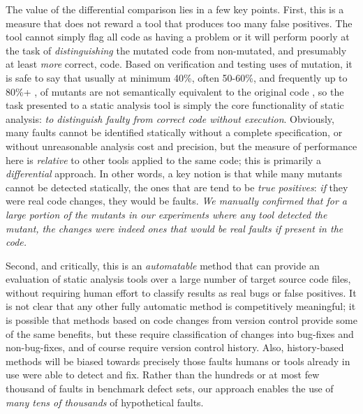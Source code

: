 The value of the differential comparison lies in a few key points.  First, this is a measure that does not reward a tool that produces too many false positives.  The tool cannot simply flag all code as having a problem or it will perform poorly at the task of \emph{distinguishing} the mutated code from non-mutated, and presumably at least \emph{more} correct, code.  Based on verification and testing uses of mutation, it is safe to say that usually at minimum 40\%, often 50-60\%, and frequently up to 80\%+ \cite{mutKernel,groce2018verified,le2014mucheck}, of mutants are not semantically equivalent to the original code \cite{TCE,impactEquiv,smith2009should}, so the task presented to a static analysis tool is simply the core functionality of static analysis: \emph{to distinguish faulty from correct code without execution}.  Obviously, many faults cannot be identified statically without a complete specification, or without unreasonable analysis cost and precision, but the measure of performance here is \emph{relative} to other tools applied to the same code; this is primarily a \emph{differential} approach.  In other words, a key notion is that while many mutants cannot be detected statically, the ones that are tend to be \emph{true positives}: \emph{if} they were real code changes, they would be faults.  \emph{We manually confirmed that for a large portion of the mutants in our experiments where any tool detected the mutant, the changes were indeed ones that would be real faults if present in the code.}

Second, and critically, this is an \emph{automatable} method that can provide an evaluation of static analysis tools over a large number of target source code files, without requiring human effort to classify results as real bugs or false positives.  It is not clear that any other fully automatic method is competitively meaningful; it is possible that methods based on code changes from version control provide some of the same benefits, but these require classification of changes into bug-fixes and non-bug-fixes, and of course require version control history.  Also, history-based methods will be biased towards precisely those faults humans or tools already in use were able to detect and fix.  Rather than the hundreds \cite{just2014defects4j} or at most few thousand of faults \cite{BugSwarm} in benchmark defect sets, our approach enables the use of \emph{many tens of thousands} of hypothetical faults.

